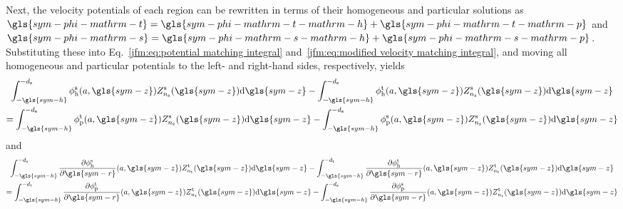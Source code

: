 \documentclass[ASNA,twocolumn]{USG} %
\begin{document}
Next, the velocity potentials of each region can be rewritten in terms of their homogeneous and particular solutions as $\gls{sym-phi-mathrm-t}=\gls{sym-phi-mathrm-t-mathrm-h} + \gls{sym-phi-mathrm-t-mathrm-p}$ and $\gls{sym-phi-mathrm-s}=\gls{sym-phi-mathrm-s-mathrm-h} + \gls{sym-phi-mathrm-s-mathrm-p}$.
Substituting these into Eq.~\ref{jfm:eq:potential matching integral} and~\ref{jfm:eq:modified velocity matching integral},
and moving all homogeneous and particular potentials to the left- and right-hand sides, respectively, yields
\begin{multline}\label{jfm:eq:separated potential matching integral}
    \int_{-\gls{sym-h}}^{-d_\mathrm{s}}
        \phi^\mathrm{s}_\mathrm{h}(a,\gls{sym-z})
        Z^\mathrm{s}_{n_\mathrm{s}}(\gls{sym-z})
        \mathrm{d}\gls{sym-z}
    -\int_{-\gls{sym-h}}^{-d_\mathrm{s}}
        \phi^\mathrm{t}_\mathrm{h}(a,\gls{sym-z})
        Z^\mathrm{s}_{n_\mathrm{s}}(\gls{sym-z})
        \mathrm{d}\gls{sym-z} \\
    =
    \int_{-\gls{sym-h}}^{-d_\mathrm{s}}
        \phi^\mathrm{t}_\mathrm{p}(a,\gls{sym-z})
        Z^\mathrm{s}_{n_\mathrm{s}}(\gls{sym-z})
        \mathrm{d}\gls{sym-z}
    -\int_{-\gls{sym-h}}^{-d_\mathrm{s}}
        \phi^\mathrm{s}_\mathrm{p}(a,\gls{sym-z})
        Z^\mathrm{s}_{n_\mathrm{s}}(\gls{sym-z})
        \mathrm{d}\gls{sym-z}
\end{multline}
and
\begin{multline}\label{jfm:eq:separated velocity matching integral}
    \int_{-\gls{sym-h}}^{-d_\mathrm{s}}
        \frac{
                \partial \phi^\mathrm{s}_\mathrm{h}
            }
            {
                \partial \gls{sym-r}
            }
            (a,\gls{sym-z})
            Z^\mathrm{t}_{n_\mathrm{t}}(\gls{sym-z})
            \mathrm{d}\gls{sym-z}
    -\int_{-\gls{sym-h}}^{-d_\mathrm{t}}
        \frac{
                \partial \phi_\mathrm{h}^\mathrm{t}
            }
            {
                \partial \gls{sym-r}
            }
            (a,\gls{sym-z})
            Z^\mathrm{t}_{n_\mathrm{t}}(\gls{sym-z})
            \mathrm{d}\gls{sym-z} \\ 
    =\int_{-\gls{sym-h}}^{-d_\mathrm{t}}
        \frac{
                \partial \phi_\mathrm{p}^\mathrm{t}
            }
            {
                \partial \gls{sym-r}
            }
            (a,\gls{sym-z})
            Z^\mathrm{t}_{n_\mathrm{t}}(\gls{sym-z})
            \mathrm{d}\gls{sym-z}
    -\int_{-\gls{sym-h}}^{-d_\mathrm{s}}
        \frac{
                \partial \phi_\mathrm{p}^\mathrm{s}
            }
            {
                \partial \gls{sym-r}
            }
            (a,\gls{sym-z})
            Z^\mathrm{t}_{n_\mathrm{t}}(\gls{sym-z})
            \mathrm{d}\gls{sym-z}
\end{multline}
\end{document}

